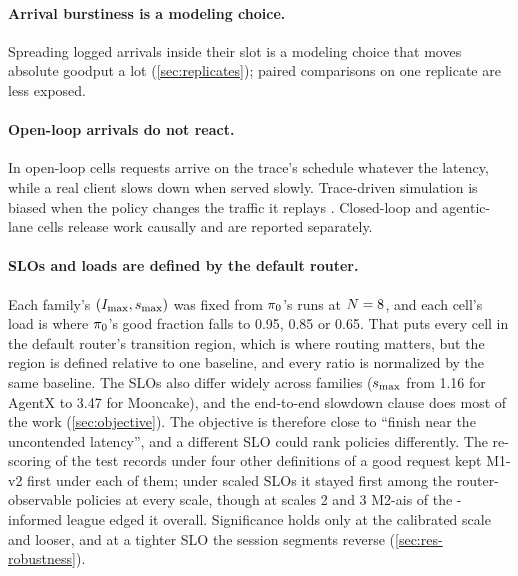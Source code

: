 \paragraph{Arrival burstiness is a modeling choice.}
Spreading logged arrivals inside their slot is a modeling choice that moves absolute goodput a lot
(\cref{sec:replicates}); paired comparisons on one replicate are less exposed.

\paragraph{Open-loop arrivals do not react.}
In open-loop cells requests arrive on the trace's schedule whatever the latency, while a real
client slows down when served slowly. Trace-driven simulation is biased when the policy changes
the traffic it replays \citep{alomar2023causalsim}. Closed-loop and agentic-lane cells release
work causally and are reported separately.

\paragraph{SLOs and loads are defined by the default router.}
Each family's $(I_{\max}, s_{\max})$ was fixed from $\pi_{0}$'s runs at $N = 8$, and each cell's load
is where $\pi_{0}$'s good fraction falls to 0.95, 0.85 or 0.65. That puts every cell in the default
router's transition region, which is where routing matters, but the region is defined relative to
one baseline, and every ratio is normalized by the same baseline. The SLOs also differ widely
across families ($s_{\max}$ from 1.16 for AgentX to 3.47 for Mooncake), and the end-to-end slowdown
clause does most of the work (\cref{sec:objective}). The objective is therefore close to ``finish
near the uncontended latency'', and a different SLO could rank policies differently. The
re-scoring of the test records under four other definitions of a good request kept M1-v2 first
under each of them; under scaled SLOs it stayed first among the router-observable policies at every
scale, though at scales 2 and 3 M2-ais of the \ais{}-informed league edged it overall. Significance holds only at
the calibrated scale and looser, and at a tighter SLO the session segments reverse
(\cref{sec:res-robustness}).

